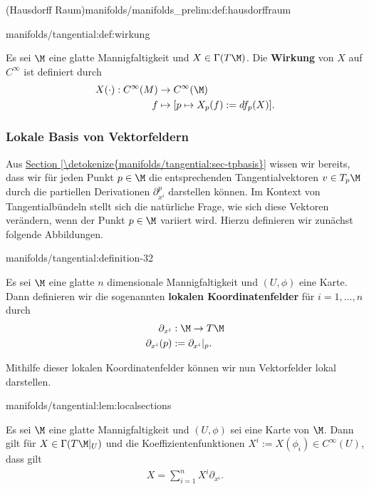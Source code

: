 \documentclass[letterpaper,10pt,english]{jupyterBook}
\begin{document}
\begin{definition}{(Hausdorff Raum)}{manifolds/manifolds_prelim:def:hausdorffraum}
\begin{definition}{}{manifolds/tangential:def:wirkung}
\par
Es sei \(\M\) eine glatte Mannigfaltigkeit und \(X\in\Gamma(T\M)\).
Die \textbf{Wirkung} von \(X\) auf \(C^\infty\) ist definiert durch
\begin{align*}
X(\cdot):C^\infty(M) &\to C^\infty(\M)\\
f &\mapsto [p\mapsto X_p(f) := df_p(X)].
\end{align*}\end{definition}


\subsubsection{Lokale Basis von Vektorfeldern}
\label{\detokenize{manifolds/tangential:lokale-basis-von-vektorfeldern}}
\par
Aus \hyperref[\detokenize{manifolds/tangential:sec-tpbasis}]{Section \ref{\detokenize{manifolds/tangential:sec-tpbasis}}} wissen wir bereits, dass wir für jeden Punkt \(p\in\M\) die entsprechenden Tangentialvektoren \(v\in T_p\M\) durch die partiellen Derivationen \(\partial_{x^i}^p\) darstellen können.
Im Kontext von Tangentialbündeln stellt sich die natürliche Frage, wie sich diese Vektoren verändern, wenn der Punkt \(p\in\M\) variiert wird.
Hierzu definieren wir zunächst folgende Abbildungen.
\begin{definition}{}{manifolds/tangential:definition-32}



\par
Es sei \(\M\) eine glatte \(n\) dimensionale Mannigfaltigkeit und \((U,\phi)\) eine Karte.
Dann definieren wir die sogenannten \textbf{lokalen Koordinatenfelder} für \(i=1,\ldots,n\) durch
\begin{align*}
\partial_{x^{i}}&:\M\to T\M\\
\partial_{x^{i}}(p)&:= \partial_{x^{i}}\rvert_p.\end{align*}\end{definition}

\par
Mithilfe dieser lokalen Koordinatenfelder können wir nun Vektorfelder lokal darstellen.
\begin{lemma}{}{manifolds/tangential:lem:localsections}



\par
Es sei \(\M\) eine glatte Mannigfaltigkeit und \((U,\phi)\) sei eine Karte von \(\M\).
Dann gilt für \(X\in\Gamma(T\M\rvert_U)\) und die Koeffizientenfunktionen \(X^i:=X(\phi_i)\in C^\infty(U)\), dass gilt
\begin{align*}
X = \sum_{i=1}^n X^i \partial_{x^{i}}.
\end{align*}\end{lemma}


\end{definition}
\end{document}
